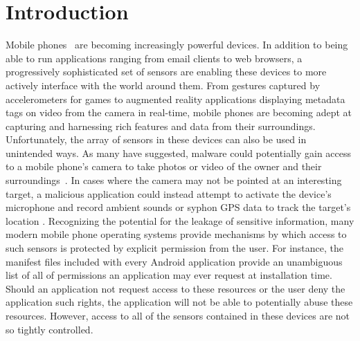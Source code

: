 \documentclass{acm_proc_article-sp}
\begin{document}
\maketitle
\begin{abstract}
[to - fill]
\end{abstract}

\section{Introduction}
\label{sec:introduction}
\noindent Mobile phones~\cite{spiphone} are becoming increasingly powerful
devices. In addition to being able to run applications ranging from email
clients to web browsers, a progressively sophisticated set of sensors are
enabling these devices to more actively interface with the world
around them. From gestures captured by accelerometers for games
to augmented reality applications displaying metadata tags on video
from the camera in real-time, mobile phones are becoming adept
at capturing and harnessing rich features and data from their surroundings.
Unfortunately, the array of sensors in these devices can also be
used in unintended ways. As many have suggested, malware could
potentially gain access to a mobile phone's camera to take photos or
video of the owner and their surroundings~\cite{cheng2007mobile}. In cases where
the camera may not be pointed at an interesting target, a malicious
application could instead attempt to activate the device's microphone
and record ambient sounds or syphon GPS data to track the
target's location
\cite{dagon2004mobile, cai2009defending, enck2010taintdroid, egele2011pios}.
Recognizing the potential for the leakage of sensitive information, many
modern mobile phone operating systems provide mechanisms by which access to
such sensors is protected by explicit permission from the user. For instance,
the manifest files included with every Android application provide an
unambiguous list of all of permissions an application may ever request
at installation time. Should an application not request access
to these resources or the user deny the application such rights, the
application will not be able to potentially abuse these resources.
However, access to all of the sensors contained in these devices are
not so tightly controlled.
\end{document}
